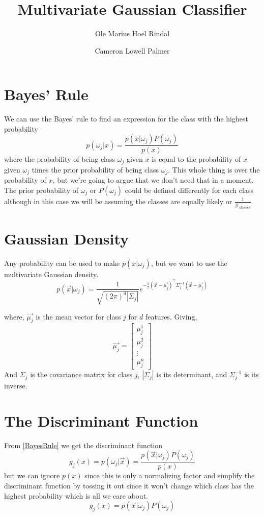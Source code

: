 \documentclass[12pt, a4paper]{report}
\author{Ole Marius Hoel Rindal \and Cameron Lowell Palmer}
\title{Multivariate Gaussian Classifier}
\begin{document}
	\maketitle
	
	\section*{Bayes' Rule}
	We can use the Bayes' rule to find an expression for the class with the highest probability
	\begin{equation}
		p(\omega_j|x) = \frac{p(x|\omega_j)P(\omega_j)}{p(x)}
		\label{BayesRule}
	\end{equation}
	where the probability of being class $\omega_j$ given $x$ is equal to the probability of $x$ given $\omega_j$ times the prior probability of being class $\omega_j$. This whole thing is over the probability of $x$, but we're going to argue that we don't need that in a moment. The prior probability of $\omega_j$ or $P(\omega_j)$ could be defined differently for each class although in this case we will be assuming the classes are equally likely or $\frac{1}{\#_{classes}}$. 
	\section*{Gaussian Density}
	Any probability can be used to make $p(x|\omega_j)$, but we want to use the multivariate Gaussian density.
	\begin{equation}
		p(\vec{x}|\omega_j) = \frac{1}{\sqrt{(2\pi)^d|\Sigma_j|}}e^{-\frac{1}{2}(\vec{x}-\vec{\mu_j})^\intercal\Sigma_j^{-1}(\vec{x}-\vec{\mu_j})}
	\end{equation}
	
	where, $\vec{\mu_j}$ is the mean vector for class $j$ for $d$ features. Giving, 
	\begin{equation}
		\vec{\mu_j} = \begin{bmatrix}
			\mu_j^1\\\mu_j^2\\\vdots\\\mu_j^n
		\end{bmatrix}
	\end{equation}
	And $\Sigma_j$ is the covariance matrix for class $j$, $|\Sigma_j|$ is its determinant, and $\Sigma_j^{-1}$ is its inverse.
	
	\section*{The Discriminant Function}
	From \eqref{BayesRule} we get the discriminant function 
	\begin{equation}
		g_j(x) = p(\omega_j|\vec{x}) = \frac{p(\vec{x}|\omega_j)P(\omega_j)}{p(x)}
	\end{equation}
	but we can ignore $p(x)$ since this is only a normalizing factor and simplify the discriminant function by tossing it out since it won't change which class has the highest probability which is all we care about.
	\begin{equation}
		g_j(x) = p(\vec{x}|\omega_j)P(\omega_j)
	\end{equation}
	
\end{document}
